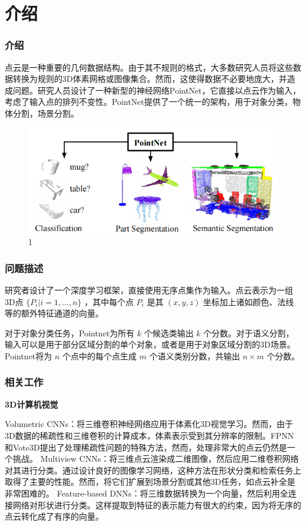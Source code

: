 \section{介绍}

\begin{frame}
  \frametitle{介绍}

点云是一种重要的几何数据结构。由于其不规则的格式，大多数研究人员将这些数据转换为规则的3D体素网格或图像集合。然而，这使得数据不必要地庞大，并造成问题。研究人员设计了一种新型的神经网络PointNet，它直接以点云作为输入，考虑了输入点的排列不变性。PointNet提供了一个统一的架构，用于对象分类，物体分割，场景分割。

\begin{figure}
\includegraphics[scale=0.55]{doc/img/f1.png}
\caption{ 1}
\end{figure}

\end{frame}

\begin{frame}
 \frametitle{问题描述}

 研究者设计了一个深度学习框架，直接使用无序点集作为输入。点云表示为一组3D点 $\{P_i | i = 1, ... ,n \} $ ，其中每个点 $P_i$ 是其 $(x,y,z)$ 坐标加上诸如颜色、法线等的额外特征通道的向量。

对于对象分类任务，Pointnet为所有 $k$ 个候选类输出 $k$ 个分数。对于语义分割，输入可以是用于部分区域分割的单个对象，或者是用于对象区域分割的3D场景。Pointnet将为 $n$ 个点中的每个点生成 $m$ 个语义类别分数，共输出 $n \times m$ 个分数。

\end{frame}

\begin{frame}
\frametitle{相关工作}

\textbf{3D计算机视觉}

Volumetric CNNs：将三维卷积神经网络应用于体素化3D视觉学习。然而，由于3D数据的稀疏性和三维卷积的计算成本，体素表示受到其分辨率的限制。FPNN和Vote3D提出了处理稀疏性问题的特殊方法，然而，处理非常大的点云仍然是一个挑战。
Multiview CNNs：将三维点云渲染成二维图像，然后应用二维卷积网络对其进行分类。通过设计良好的图像学习网络，这种方法在形状分类和检索任务上取得了主要的性能。然而，将它们扩展到场景分割或其他3D任务，如点云补全是非常困难的。
Feature-based DNNs：将三维数据转换为一个向量，然后利用全连接网络对形状进行分类。这样提取到特征的表示能力有很大的约束，因为将无序的点云转化成了有序的向量。
    
\end{frame}

